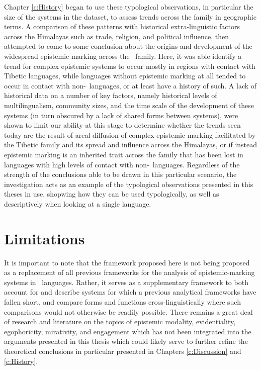 Chapter \ref{c:History} began to use these typological observations, in particular the size of the systems in the dataset, to assess trends across the family in geographic terms. A comparison of these patterns with historical extra-linguistic factors across the Himalayas such as trade, religion, and political influence, then attempted to come to some conclusion about the origins and development of the widespread epistemic marking across the \lfam\ family. Here, it was able identify a trend for complex epistemic systems to occur mostly in regions with contact with Tibetic languages, while languages without epistemic marking at all tended to occur in contact with non-\lfam\ languages, or at least have a history of such. A lack of historical data on a number of key factors, namely historical levels of multilingualism, community sizes, and the time scale of the development of these systems (in turn obscured by a lack of shared forms between systems), were shown to limit our ability at this stage to determine whether the trends seen today are the result of areal diffusion of complex epistemic marking facilitated by the Tibetic family and its spread and influence across the Himalayas, or if instead epistemic marking is an inherited trait across the family that has been lost in languages with high levels of contact with non-\lfam\ languages. Regardless of the strength of the conclusions able to be drawn in this particular scenario, the investigation acts as an example of the typological observations presented in this theses in use, shopwing how they can be used typologically, as well as descriptively when looking at a single language.

\section{Limitations}
It is important to note that the framework proposed here is not being proposed as a replacement of all previous frameworks for the analysis of epistemic-marking systems in \lfam\ languages. Rather, it serves as a supplementary framework to both account for and describe systems for which a previous analytical frameworks have fallen short, and compare forms and functions cross-linguistically where such comparisons would not otherwise be readily possible. There remains a great deal of research and literature on the topics of epistemic modality, evidentiality, egophoricity, mirativity, and engagement which has not been integrated into the arguments presented in this thesis which could likely serve to further refine the theoretical conclusions in particular presented in Chapters \ref{c:Discussion} and \ref{c:History}.

